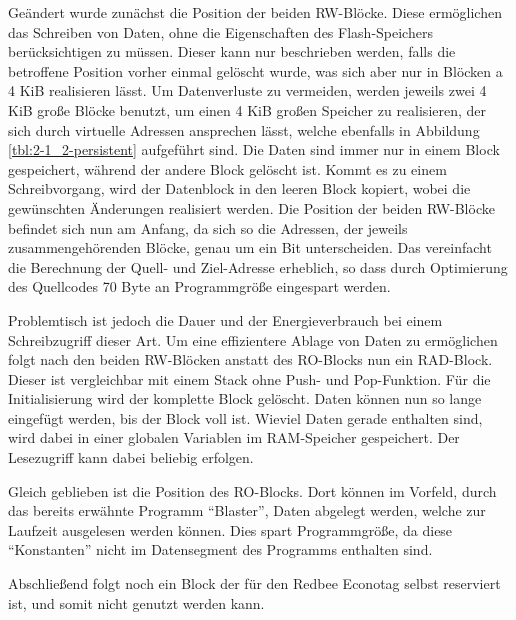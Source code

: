 Geändert wurde zunächst die Position der beiden RW-Blöcke. Diese ermöglichen das Schreiben von Daten, ohne die Eigenschaften des Flash-Speichers berücksichtigen
zu müssen. Dieser kann nur beschrieben werden, falls die betroffene Position vorher einmal gelöscht wurde, was sich aber nur in Blöcken a 4 KiB realisieren lässt.
Um Datenverluste zu vermeiden, werden jeweils zwei 4 KiB große Blöcke benutzt, um einen 4 KiB großen Speicher zu realisieren, der sich durch virtuelle Adressen
ansprechen lässt, welche ebenfalls in Abbildung \ref{tbl:2-1_2-persistent} aufgeführt sind. Die Daten sind immer nur in einem Block gespeichert, während der andere
Block gelöscht ist. Kommt es zu einem Schreibvorgang, wird der Datenblock in den leeren Block kopiert, wobei die gewünschten Änderungen realisiert werden.
Die Position der beiden RW-Blöcke befindet sich nun am Anfang, da sich so die Adressen, der jeweils zusammengehörenden Blöcke, genau um ein Bit unterscheiden.
Das vereinfacht die Berechnung der Quell- und Ziel-Adresse erheblich, so dass durch Optimierung des Quellcodes 70 Byte an Programmgröße eingespart werden.

Problemtisch ist jedoch die Dauer und der Energieverbrauch bei einem Schreibzugriff dieser Art. Um eine effizientere Ablage von Daten zu ermöglichen folgt
nach den beiden RW-Blöcken anstatt des RO-Blocks nun ein RAD-Block. Dieser ist vergleichbar mit einem Stack ohne Push- und Pop-Funktion. Für die Initialisierung
wird der komplette Block gelöscht. Daten können nun so lange eingefügt werden, bis der Block voll ist. Wieviel Daten gerade enthalten sind, wird dabei in einer
globalen Variablen im RAM-Speicher gespeichert. Der Lesezugriff kann dabei beliebig erfolgen.

Gleich geblieben ist die Position des RO-Blocks. Dort können im Vorfeld, durch das bereits erwähnte Programm "`Blaster"', Daten abgelegt werden, welche zur Laufzeit
ausgelesen werden können. Dies spart Programmgröße, da diese "`Konstanten"' nicht im Datensegment des Programms enthalten sind.

Abschließend folgt noch ein Block der für den Redbee Econotag selbst reserviert ist, und somit nicht genutzt werden kann.